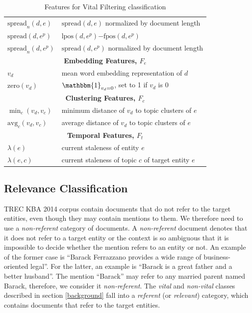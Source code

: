 \documentclass{sig-alternate}
\begin{document}
\begin{table}[tb]
{\begin{tabular}{p{}p{}}
$\text{spread}_n(d,e)$ & $\text{spread}(d,e)$ normalized by document length \\
$\text{spread}(d,e^p)$ & $\text{lpos}(d,e^p)\mathord{-}\text{fpos}(d,e^p)$ \\
$\text{spread}_n(d,e^p)$ & $\text{spread}(d,e^p)$ normalized by document length \\ 
\midrule
\multicolumn{2}{c}{\textbf{Embedding Features, $F_e$}} \\ %
\midrule
  $v_d$ & mean word embedding representation of $d$ \\
  $\text{zero}(v_d)$& $\mathbbm{1}_{v_d=0}$, set to 1 if $v_d$ is $0$ \\
\midrule
\multicolumn{2}{c}{\textbf{Clustering Features, $F_c$}} \\ %
\midrule
  $\min_c(v_d,v_c)$& minimum distance of $v_d$ to topic clusters of $e$ \\
  $\text{avg}_c(v_d,v_c)$& average distance of $v_d$ to topic clusters of $e$ \\
\midrule
\multicolumn{2}{c}{\textbf{Temporal Features, $F_t$}} \\ %
\midrule
  $\lambda(e)$& current staleness of entity $e$ \\
  $\lambda(e,c)$& current staleness of topic $c$ of target entity $e$ \\
\bottomrule
\end{tabular}
} %
\caption{Features for Vital Filtering classification}
\label{features}
\end{table}


\subsection{Relevance Classification}

TREC KBA 2014 corpus contain documents that do not refer to the target entities, even though they may contain mentions to them. We therefore need to use a \emph{non-referent} category of documents. 
%
A \emph{non-referent} document denotes that it does not refer to a target entity or the context is so ambiguous that it is impossible to decide whether the mention refers to an entity or not. An example of the former case is ``Barack Ferrazzano provides a wide range of business-oriented legal''. For the latter, an example is ``Barack is a great father and a better husband''. The mention ``Barack'' may refer to any married parent named Barack, therefore, we consider it \emph{non-referent}.
%
The \emph{vital} and \emph{non-vital} classes described in section \ref{background} fall into a \emph{referent} (or \emph{relevant}) category, which contains documents that refer to the target entities.
\end{document}
